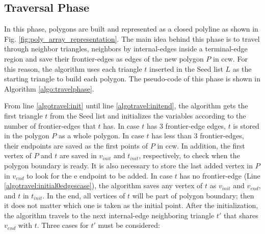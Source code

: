 \documentclass[lineno,pdflatex,sn-mathphys]{sn-jnl}%
\theoremstyle{thmstyleone}%
\theoremstyle{thmstyletwo}%
\theoremstyle{thmstylethree}%
\begin{document}

\subsection{Traversal Phase}
\label{subsec:Travelpohase}

In this phase, polygons are built and represented as a closed polyline as shown in Fig. \ref{fig:poly_array_representation}. The main idea behind this phase is to travel through neighbor triangles, neighbors by  internal-edges inside a terminal-edge region and save their frontier-edges as edges of the new polygon $P$ in ccw. For this reason, the algorithm uses each triangle $t$ inserted in the Seed list $L$ as the starting triangle to build each polygon. The pseudo-code of this phase is shown in Algorithm \ref{algo:travelphase}. 

From line \ref{algotravel:init} until line \ref{algotravel:initend}, the algorithm gets the first triangle $t$ from the Seed list and  initializes the variables according to  the number of frontier-edges that $t$ has.  In case $t$ has 3 frontier-edge edges, $t$ is stored in the polygon $P$ as a whole polygon. In case $t$ has less than $3$ frontier-edges, their endpoints are saved as the first points of $P$ in ccw. In addition, the first vertex  of $P$ and $t$ are saved in $v_{init}$ and $t_{init}$, respectively, to check when the polygon boundary is ready. It is also necessary to store the last added vertex  in $P$ in $v_{end}$ to look for the e endpoint to be added. In case $t$ has no frontier-edge (Line \ref{algotravel:initial0edgescase}), the algorithm saves any vertex of $t$ as $v_{init}$ and $v_{end}$, and  $t$ in $t_{init}$. In the end, all vertices of $t$ will be part of polygon boundary; then it does not matter which one is taken as the initial point. After the initialization, the algorithm travels to the next internal-edge neighboring triangle $t'$ that shares $v_{end}$ with $t$. Three cases for $t'$ must be  considered:

\end{document}
